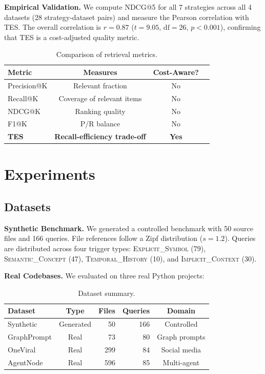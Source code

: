 \documentclass[11pt]{article}
\begin{document}
\textbf{Empirical Validation.} We compute NDCG@5 for all 7 strategies across all 4 datasets (28 strategy-dataset pairs) and measure the Pearson correlation with TES. The overall correlation is $r = 0.87$ ($t = 9.05$, $\text{df} = 26$, $p < 0.001$), confirming that TES is a cost-adjusted quality metric.

\begin{table}[t]
\centering
\small
\caption{Comparison of retrieval metrics.}
\label{tab:metrics}
\begin{tabular}{@{}lccc@{}}
\toprule
\textbf{Metric} & \textbf{Measures} & \textbf{Cost-Aware?} \\
\midrule
Precision@K & Relevant fraction & No \\
Recall@K & Coverage of relevant items & No \\
NDCG@K & Ranking quality & No \\
F1@K & P/R balance & No \\
\textbf{TES} & \textbf{Recall-efficiency trade-off} & \textbf{Yes} \\
\bottomrule
\end{tabular}
\end{table}

\section{Experiments}

\subsection{Datasets}

\textbf{Synthetic Benchmark.} We generated a controlled benchmark with 50 source files and 166 queries. File references follow a Zipf distribution ($s = 1.2$). Queries are distributed across four trigger types: \textsc{Explicit\_Symbol} (79), \textsc{Semantic\_Concept} (47), \textsc{Temporal\_History} (10), and \textsc{Implicit\_Context} (30).

\textbf{Real Codebases.} We evaluated on three real Python projects:

\begin{table}[t]
\centering
\small
\caption{Dataset summary.}
\label{tab:datasets}
\begin{tabular}{@{}lcrrc@{}}
\toprule
\textbf{Dataset} & \textbf{Type} & \textbf{Files} & \textbf{Queries} & \textbf{Domain} \\
\midrule
Synthetic & Generated & 50 & 166 & Controlled \\
GraphPrompt & Real & 73 & 80 & Graph prompts \\
OneViral & Real & 299 & 84 & Social media \\
AgentNode & Real & 596 & 85 & Multi-agent \\
\bottomrule
\end{tabular}
\end{table}
\end{document}
